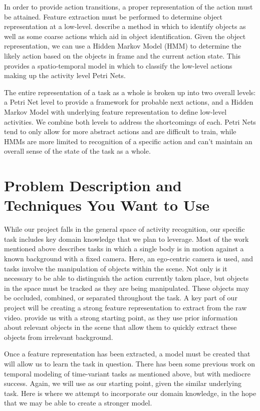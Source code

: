\documentclass[10pt,letterpaper]{article}
\begin{document}
In order to provide action transitions, a proper representation of the action must be attained. Feature extraction must be performed to determine object representation at a low-level. \cite{fathi2011understanding} describe a method in which to identify objects as well as some coarse actions which aid in object identification. Given the object representation, we can use a Hidden Markov Model (HMM) to determine the likely action based on the objects in frame and the current action state. This provides a spatio-temporal model in which to classify the low-level actions making up the activity level Petri Nets.

The entire representation of a task as a whole is broken up into two overall levels: a Petri Net level to provide a framework for probable next actions, and a Hidden Markov Model with underlying feature representation to define low-level activities. We combine both levels to address the shortcomings of each. Petri Nets tend to only allow for more abstract actions and are difficult to train, while HMMs are more limited to recognition of a specific action and can't maintain an overall sense of the state of the task as a whole.
  
\section{Problem Description and Techniques You Want to Use}

While our project falls in the general space of activity recognition, our specific task includes key domain knowledge that we plan to leverage. Most of the work mentioned above describes tasks in which a single body is in motion against a known background with a fixed camera. Here, an ego-centric camera is used, and tasks involve the manipulation of objects within the scene. Not only is it necessary to be able to distinguish the action currently taken place, but objects in the space must be tracked as they are being manipulated. These objects may be occluded, combined, or separated throughout the task. A key part of our project will be creating a strong feature representation to extract from the raw video. \cite{starner1998real} provide us with a strong starting point, as they use prior information about relevant objects in the scene that allow them to quickly extract these objects from irrelevant background. 

Once a feature representation has been extracted, a model must be created that will allow us to learn the task in question. There has been some previous work on temporal modeling of time-variant tasks as mentioned above, but with mediocre success. Again, we will use \cite{starner1998real} as our starting point, given the similar underlying task. Here is where we attempt to incorporate our domain knowledge, in the hope that we may be able to create a stronger model.
\end{document}
